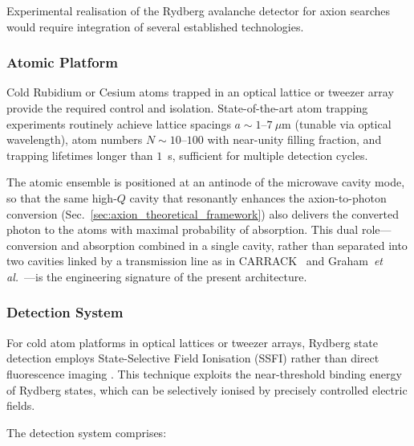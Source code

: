 Experimental realisation of the Rydberg avalanche detector for axion searches would require integration of several established technologies.

\subsubsection{Atomic Platform}

Cold Rubidium or Cesium atoms trapped in an optical lattice or tweezer array provide the required control and isolation. State-of-the-art atom trapping experiments routinely achieve lattice spacings $a \sim 1$--$7~\mu$m (tunable via optical wavelength), atom numbers $N \sim 10$--$100$ with near-unity filling fraction, and trapping lifetimes longer than $1$~s, sufficient for multiple detection cycles.

The atomic ensemble is positioned at an antinode of the microwave cavity mode, so that the same high-$Q$ cavity that resonantly enhances the axion-to-photon conversion (Sec.~\ref{sec:axion_theoretical_framework}) also delivers the converted photon to the atoms with maximal probability of absorption. This dual role---conversion and absorption combined in a single cavity, rather than separated into two cavities linked by a transmission line as in CARRACK~\cite{Yamamoto2001,Tada1999} and Graham~\emph{et al.}~\cite{Graham2024}---is the engineering signature of the present architecture.

\subsubsection{Detection System}

For cold atom platforms in optical lattices or tweezer arrays, Rydberg state detection employs State-Selective Field Ionisation (SSFI) rather than direct fluorescence imaging \cite{Gallagher2005, Zhang2024Review}. This technique exploits the near-threshold binding energy of Rydberg states, which can be selectively ionised by precisely controlled electric fields.

The detection system comprises:

